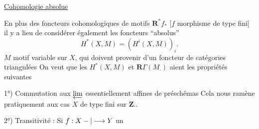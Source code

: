 \uline{Cohomologie absolue}

En plus des foncteurs cohomologiques de motifs $\mathbf{R}^{*}f_*$ [$f$ morphisme de type fini] il y a lieu de considérer également les foncteurs ``absolus''
\[
H^*(X,M)=(H^i(X,M))_i.
\]
$M$ motif variable sur $X$, qui doivent provenir d'un foncteur de catégories triangulées
On veut que les $H^*(X,M)$ et $\mathbf{R}\Gamma(M_\cdot)$ aient les propriétés suivantes

1°) Commutation aux $\varprojlim$ essentiellement affines de préschémas  
Cela nous ramène pratiquement aux cas $X$ de type fini sur $\mathbf{Z}$..

2°) Transitivité : Si $f:X-|\longrightarrow Y$ un
